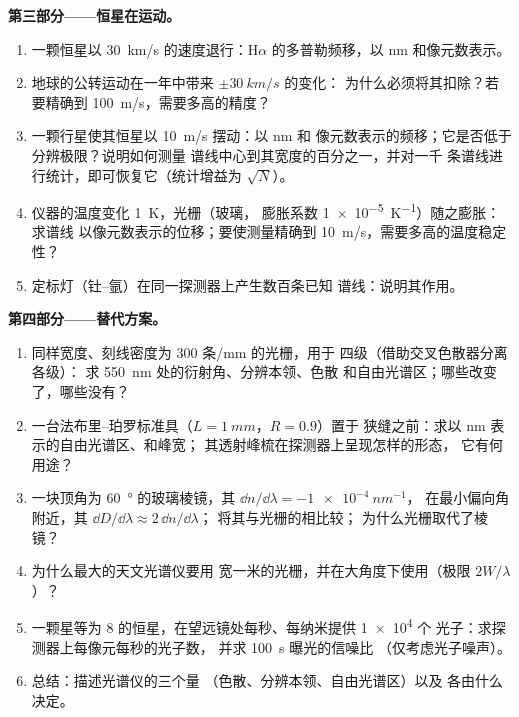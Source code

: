 \begin{problem}
\medskip
\noindent\textbf{第三部分——恒星在运动。}
\begin{enumerate}[resume]
  \item 一颗恒星以 \qty{30}{km/s} 的速度退行：H$\alpha$ 的多普勒频移，以 nm
        和像元数表示。
  \item 地球的公转运动在一年中带来 $\pm\qty{30}{km/s}$ 的变化：
        为什么必须将其扣除？若要精确到
        \qty{100}{m/s}，需要多高的精度？
  \item 一颗行星使其恒星以 \qty{10}{m/s} 摆动：以 nm 和
        像元数表示的频移；它是否低于分辨极限？说明如何测量
        谱线中心到其宽度的百分之一，并对一千
        条谱线进行统计，即可恢复它（统计增益为 $\sqrt{N}$）。
  \item 仪器的温度变化 \qty{1}{K}，光栅（玻璃，
        膨胀系数 \qty{1e-5}{K^{-1}}）随之膨胀：求谱线
        以像元数表示的位移；要使测量精确到 \qty{10}{m/s}，需要多高的温度稳定性？
  \item 定标灯（钍–氩）在同一探测器上产生数百条已知
        谱线：说明其作用。
\end{enumerate}

\medskip
\noindent\textbf{第四部分——替代方案。}
\begin{enumerate}[resume]
  \item 同样宽度、刻线密度为 $300$ 条/mm 的光栅，用于
        四级（借助交叉色散器分离各级）：
        求 \qty{550}{nm} 处的衍射角、分辨本领、色散
        和自由光谱区；哪些改变了，哪些没有？
  \item 一台法布里–珀罗标准具（$L = \qty{1}{mm}$，$R = 0.9$）置于
        狭缝之前：求以 nm 表示的自由光谱区、和峰宽；
        其透射峰梳在探测器上呈现怎样的形态，
        它有何用途？
  \item 一块顶角为 \qty{60}{\degree} 的玻璃棱镜，其 $\dd n/\dd\lambda = \qty{-1e-4}{nm^{-1}}$，
        在最小偏向角附近，其 $\dd D/\dd\lambda \approx 2\,\dd n/\dd\lambda$；
        将其与光栅的相比较；
        为什么光栅取代了棱镜？
  \item 为什么最大的天文光谱仪要用
        宽一米的光栅，并在大角度下使用（极限
        $2W/\lambda$）？
  \item 一颗星等为 8 的恒星，在望远镜处每秒、每纳米提供 \qty{1e4}{} 个
        光子：求探测器上每像元每秒的光子数，
        并求 \qty{100}{s} 曝光的信噪比
        （仅考虑光子噪声）。
  \item 总结：描述光谱仪的三个量
        （色散、分辨本领、自由光谱区）以及
        各由什么决定。
\end{enumerate}
\end{problem}
